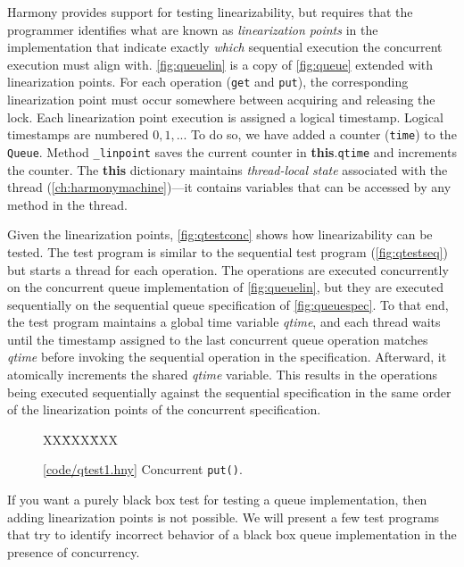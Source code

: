 \documentclass{report}
\newcommand{\harmonysource}[1]{
\begin{tabbing}
XX\=XXX\=XXX\kill
    
\end{tabbing}
}
\newcommand{\harmonylink}[1]{%
[\href{https://harmony.cs.cornell.edu/#1}{\underline{#1}}]%
}
\newenvironment{code}{
\tcolorbox
}{
\endtcolorbox
}
\begin{document}
%
Harmony provides support for testing linearizability,
but requires that the programmer
identifies what are known as \emph{linearization points}
in the implementation that indicate exactly \emph{which} sequential
execution the concurrent execution must align with.
\autoref{fig:queuelin} is a copy of \autoref{fig:queue} extended with
linearization points.
For each operation (\texttt{get} and \texttt{put}), the corresponding
linearization point must occur somewhere between acquiring and releasing
the lock.
%
Each linearization point execution is assigned a logical timestamp.
Logical timestamps are numbered $0, 1, ...$
To do so, we have added a counter (\texttt{time}) to the \texttt{Queue}.
Method \texttt{\_linpoint} saves the current counter in
\textbf{this}.\texttt{qtime} and increments the counter.
The \textbf{this} dictionary maintains \emph{thread-local state} associated
with the thread (\autoref{ch:harmonymachine})---it contains variables that
can be accessed by any method in the thread.

Given the linearization points, \autoref{fig:qtestconc} shows how
linearizability can be tested.
The test program is similar to the sequential test program
(\autoref{fig:qtestseq}) but starts a thread for each operation.
The operations are executed concurrently on the concurrent queue
implementation of \autoref{fig:queuelin}, but they are executed sequentially
on the sequential queue specification of \autoref{fig:queuespec}.
To that end, the test program maintains a global time variable
\textit{qtime}, and each thread waits until the timestamp assigned to
the last concurrent queue operation matches \textit{qtime} before invoking
the sequential operation in the specification.
Afterward, it atomically increments the shared \textit{qtime} variable.
This results in the operations being executed sequentially against the
sequential specification in the same order of the linearization points
of the concurrent specification.

\begin{figure}
\begin{code}
\harmonysource{qtest1}
\end{code}
\caption{\harmonylink{code/qtest1.hny} Concurrent \texttt{put()}.}
\label{fig:qtest1}
\end{figure}

If you want a purely black box test for testing a queue implementation,
then adding linearization points is not possible.
We will present a few test
programs that try to identify incorrect behavior of
a black box queue implementation in the presence of concurrency.
\end{document}
